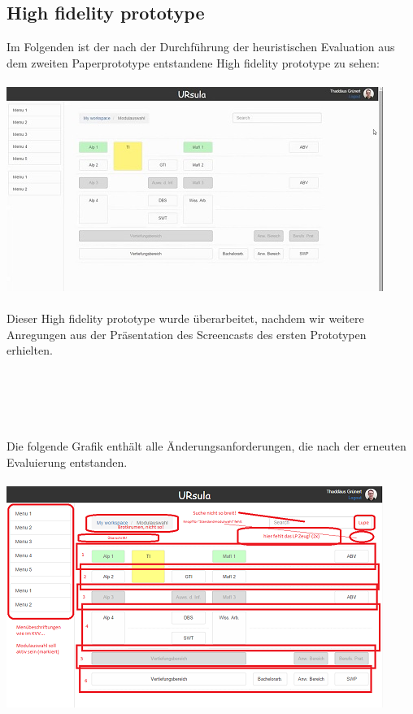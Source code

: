 \documentclass{article}
\begin{document}
\subsection{High fidelity prototype}

Im Folgenden ist der nach der Durchführung der heuristischen Evaluation aus dem zweiten Paperprototype entstandene High fidelity prototype zu sehen:\\
\\
\includegraphics{img/hfp_v1}\\
\\
Dieser High fidelity prototype wurde überarbeitet, nachdem wir weitere Anregungen aus der Präsentation des Screencasts des ersten Prototypen erhielten.\\
\\
\\
\\
\\
\\
Die folgende Grafik enthält alle Änderungsanforderungen, die nach der erneuten Evaluierung entstanden.\\
\\
\includegraphics{img/hfp_changes}\\
\end{document}

